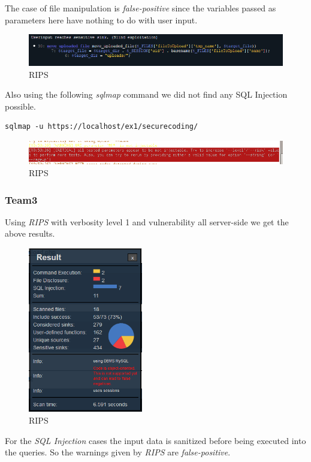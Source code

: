 \documentclass[headsepline,footsepline,footinclude=false,oneside,fontsize=11pt,paper=a4,listof=totoc,bibliography=totoc]{scrbook} %
\begin{document}
The case of file manipulation is \textit{false-positive} since the variables passed as parameters here have nothing to do with user input.
\begin{figure}[H]
	\centering
	\includegraphics[width=150mm]{logos/file1.jpg}
	\caption{RIPS \label{overflow}}
\end{figure} 

Also using the following \textit{sqlmap} command we did not find any SQL Injection possible.\\

\begin{lstlisting}
sqlmap -u https://localhost/ex1/securecoding/
\end{lstlisting}
\begin{figure}[ht!]
	\centering
	\includegraphics[width=150mm]{logos/sql.jpg}
	\caption{RIPS \label{overflow}}
\end{figure}
\pagebreak
\subsubsection{Team3}
Using \textit{RIPS} with verbosity level 1  and vulnerability all server-side we get the above results.
\begin{figure}[H]
	\centering
	\includegraphics[width=50mm]{logos/stats3.jpg}
	\caption{RIPS \label{overflow}}
\end{figure}


For the \textit{SQL Injection} cases the input data is sanitized before being executed into the queries. So the warnings given by \textit{RIPS} are \textit{false-positive}.
\end{document}
